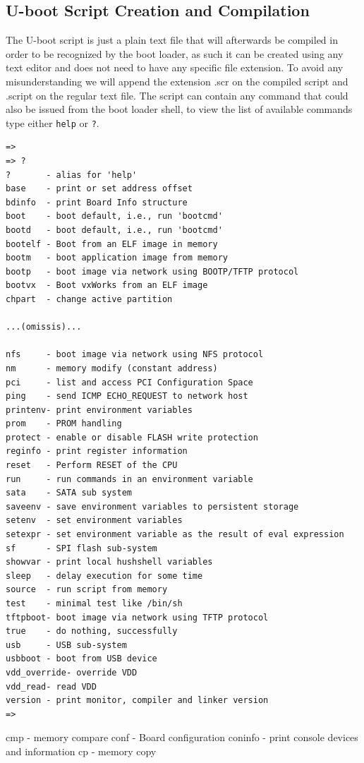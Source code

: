 \documentclass[11pt
  , a4paper
  , article
  , oneside
  , showtrims
]{memoir}
\begin{document}
\subsection{U-boot Script Creation and Compilation}
The U-boot script is just a plain text file that will afterwards be compiled in order to be recognized by the boot loader, as such it can be created using any text editor and does not need to have any specific file extension.
To avoid any misunderstanding we will append the extension .scr on the compiled script and .script on the regular text file.
The script can contain any command that could also be issued from the boot loader shell, to view the list of available commands type either \texttt{help} or \texttt{?}.

\begin{lstlisting}[style=termstyle]
=>
=> ?
?       - alias for 'help'
base    - print or set address offset
bdinfo  - print Board Info structure
boot    - boot default, i.e., run 'bootcmd'
bootd   - boot default, i.e., run 'bootcmd'
bootelf - Boot from an ELF image in memory
bootm   - boot application image from memory
bootp   - boot image via network using BOOTP/TFTP protocol
bootvx  - Boot vxWorks from an ELF image
chpart  - change active partition

...(omissis)...

nfs     - boot image via network using NFS protocol
nm      - memory modify (constant address)
pci     - list and access PCI Configuration Space
ping    - send ICMP ECHO_REQUEST to network host
printenv- print environment variables
prom    - PROM handling
protect - enable or disable FLASH write protection
reginfo - print register information
reset   - Perform RESET of the CPU
run     - run commands in an environment variable
sata    - SATA sub system
saveenv - save environment variables to persistent storage
setenv  - set environment variables
setexpr - set environment variable as the result of eval expression
sf      - SPI flash sub-system
showvar - print local hushshell variables
sleep   - delay execution for some time
source  - run script from memory
test    - minimal test like /bin/sh
tftpboot- boot image via network using TFTP protocol
true    - do nothing, successfully
usb     - USB sub-system
usbboot - boot from USB device
vdd_override- override VDD
vdd_read- read VDD
version - print monitor, compiler and linker version
=>
\end{lstlisting}
\iffalse
cmp     - memory compare
conf    - Board configuration
coninfo - print console devices and information
cp      - memory copy
\end{document}
